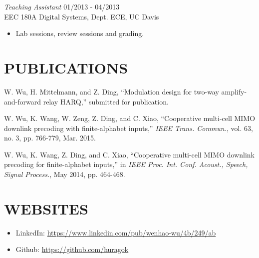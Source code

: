 \documentclass[margin]{res} %
\begin{document}
\begin{resume}
        {\sl Teaching Assistant} \hfill 01/2013 - 04/2013 \\
        EEC 180A Digital Systems, Dept. ECE, UC Davis
        \begin{itemize} 
            \item Lab sessions, review sessions and grading.
        \end{itemize} 
    
    
        \section{PUBLICATIONS}
        \begin{enumerate}[label={[\arabic*]}]
            \item W. Wu, H. Mittelmann, and Z. Ding, ``Modulation design for
            two-way amplify-and-forward relay HARQ,'' submitted for publication.
            \item W. Wu, K. Wang, W. Zeng, Z. Ding, and C. Xiao,
            ``Cooperative multi-cell MIMO downlink precoding with
            finite-alphabet inputs,'' \emph{IEEE Trans. Commun.}, vol. 63, no.
            3, pp. 766-779, Mar. 2015.
            \item W. Wu, K. Wang, Z. Ding, and C. Xiao, ``Cooperative multi-cell
            MIMO downlink precoding for finite-alphabet inputs,'' in
            \emph{IEEE Proc. Int. Conf. Acoust., Speech, Signal Process.}, May
            2014, pp. 464-468.
        \end{enumerate}
    
    
        \section{WEBSITES} 
        \begin{itemize}
            \item LinkedIn: \url{https://www.linkedin.com/pub/wenhao-wu/4b/249/ab}
            \item Github: \url{https://github.com/huragok}
        \end{itemize}
        

\end{resume}
\end{document}

